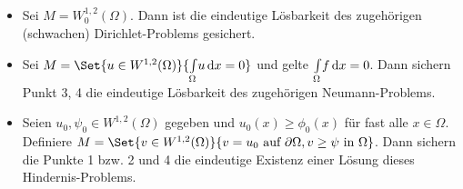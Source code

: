 \documentclass{cheat-sheet}
\begin{document}

\begin{bsp}
  \begin{itemize}
    \item Sei $M = W_0^{1,2}(\Omega)$. Dann ist die eindeutige Lösbarkeit des zugehörigen (schwachen) Dirichlet-Problems gesichert.
    \item Sei $M = \Set{ u \in W^{1,2}(\Omega) }{ \Int{\Omega}{}{u}{x} = 0 }$ und gelte ${\textstyle \int\limits_{\Omega}^{}} f \,\mathrm{d} x = 0$. Dann sichern Punkt 3, 4 die eindeutige Lösbarkeit des zugehörigen Neumann-Problems.
    \item Seien $u_0, \psi_0 \in W^{1,2}(\Omega)$ gegeben und $u_0(x) \geq \phi_0(x)$ für fast alle $x \in \Omega$. Definiere $M = \Set{ v \in W^{1,2}(\Omega) }{ v = u_0 \text{ auf } \partial \Omega, v \geq \psi \text{ in } \Omega }$. Dann sichern die Punkte 1 bzw. 2 und 4 die eindeutige Existenz einer Lösung dieses Hindernis-Problems.
  \end{itemize}
\end{bsp}



\end{document}
